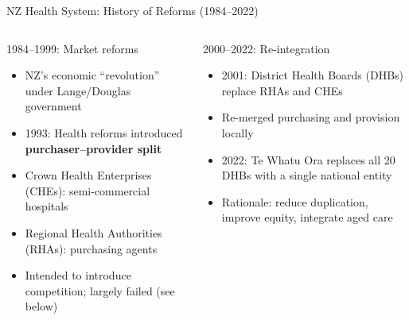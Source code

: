 \documentclass[aspectratio=169, 12pt]{beamer}
\begin{document}
\begin{frame}{NZ Health System: History of Reforms (1984--2022)}
  \begin{columns}
      \begin{block}{1984--1999: Market reforms}
        \begin{itemize}
          \item NZ's economic ``revolution'' under Lange/Douglas government
          \item 1993: Health reforms introduced \textbf{purchaser--provider split}
          \item Crown Health Enterprises (CHEs): semi-commercial hospitals
          \item Regional Health Authorities (RHAs): purchasing agents
          \item Intended to introduce competition; largely failed (see below)
        \end{itemize}
      \end{block}
      \begin{alertblock}{2000--2022: Re-integration}
        \begin{itemize}
          \item 2001: District Health Boards (DHBs) replace RHAs and CHEs
          \item Re-merged purchasing and provision locally
          \item 2022: Te Whatu Ora replaces all 20 DHBs with a single national entity
          \item Rationale: reduce duplication, improve equity, integrate aged care
        \end{itemize}
      \end{alertblock}
  \end{columns}
\end{frame}
\end{document}
